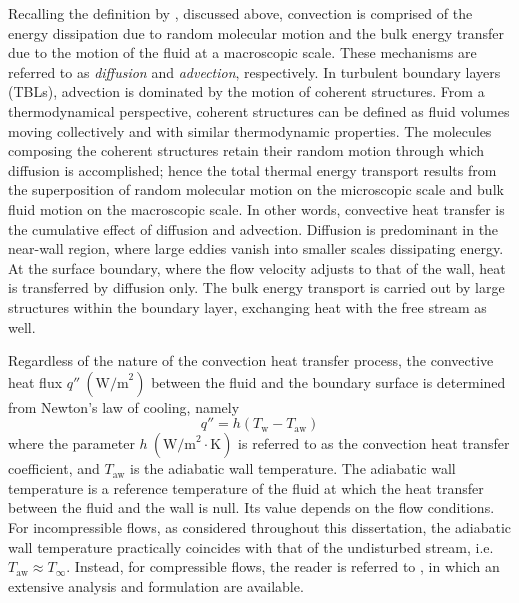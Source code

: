 Recalling the definition by \citet{Gebhart1971HT}, discussed above, convection is comprised of the energy dissipation due to random molecular motion and the bulk energy transfer due to the motion of the fluid at a macroscopic scale. These mechanisms are referred to as \textit{diffusion} and \textit{advection}, respectively. In turbulent boundary layers (TBLs), advection is dominated by the motion of coherent structures. From a thermodynamical perspective, coherent structures can be defined as fluid volumes moving collectively and with similar thermodynamic properties. The molecules composing the coherent structures retain their random motion through which diffusion is accomplished; hence the total thermal energy transport results from the superposition of random molecular motion on the microscopic scale and bulk fluid motion on the macroscopic scale. In other words, convective heat transfer is the cumulative effect of diffusion and advection. Diffusion is predominant in the near-wall region, where large eddies vanish into smaller scales dissipating energy. At the surface boundary, where the flow velocity adjusts to that of the wall, heat is transferred by diffusion only. The bulk energy transport is carried out by large structures within the boundary layer, exchanging heat with the free stream as well.

Regardless of the nature of the convection heat transfer process, the convective heat flux $q''~(\mathrm{W/m}^2)$ between the fluid and the boundary surface is determined from Newton's law of cooling, namely
\begin{equation}\label{eq:Newton_cooling}
    q'' = h(T_\mathrm{w} - T_{\mathrm{aw}})
\end{equation}
where the parameter $h~(\mathrm{W/m}^2\cdot\mathrm{K})$ is referred to as the convection heat transfer coefficient, and $T_{\mathrm{aw}}$ is the adiabatic wall temperature. The adiabatic wall temperature is a reference temperature of the fluid at which the heat transfer between the fluid and the wall is null. Its value depends on the flow conditions. For incompressible flows, as considered throughout this dissertation, the adiabatic wall temperature practically coincides with that of the undisturbed stream, i.e. $T_{\mathrm{aw}} \approx T_\infty$. Instead, for compressible flows, the reader is referred to \citet{Germain1955taw}, in which an extensive analysis and formulation are available.

